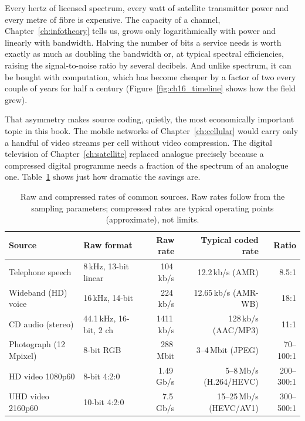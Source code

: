 Every hertz of licensed spectrum, every watt of satellite transmitter power and every metre of
fibre is expensive. The capacity of a channel, Chapter~\ref{ch:infotheory} tells us, grows only
logarithmically with power and linearly with bandwidth. Halving the number of bits a service
needs is worth exactly as much as doubling the bandwidth or, at typical spectral efficiencies,
raising the signal-to-noise ratio by several decibels. And unlike spectrum, it can be bought with
computation, which has become cheaper by a factor of two every couple of years for half a
century (Figure~\ref{fig:ch16_timeline} shows how the field grew).

That asymmetry makes source coding, quietly, the most economically important topic in this book.
The mobile networks of Chapter~\ref{ch:cellular} would carry only a handful of video streams per
cell without video compression. The digital television of Chapter~\ref{ch:satellite} replaced
analogue precisely because a compressed digital programme needs a fraction of the spectrum of an
analogue one. Table~\ref{tab:ch16:rates} shows just how dramatic the savings are.

\begin{table}[htbp]\centering\small
\caption{Raw and compressed rates of common sources. Raw rates follow from the sampling
parameters; compressed rates are typical operating points (approximate), not limits.}
\label{tab:ch16:rates}
\begin{tabularx}{\linewidth}{@{}l l r r r@{}}
\toprule
Source & Raw format & Raw rate & Typical coded rate & Ratio\\
\midrule
Telephone speech & 8\,kHz, 13-bit linear & 104\,kb/s & 12.2\,kb/s (AMR) & 8.5:1\\
Wideband (HD) voice & 16\,kHz, 14-bit & 224\,kb/s & 12.65\,kb/s (AMR-WB) & 18:1\\
CD audio (stereo) & 44.1\,kHz, 16-bit, 2 ch & 1411\,kb/s & 128\,kb/s (AAC/MP3) & 11:1\\
Photograph (12 Mpixel) & 8-bit RGB & 288\,Mbit & 3--4\,Mbit (JPEG) & 70--100:1\\
HD video 1080p60 & 8-bit 4:2:0 & 1.49\,Gb/s & 5--8\,Mb/s (H.264/HEVC) & 200--300:1\\
UHD video 2160p60 & 10-bit 4:2:0 & 7.5\,Gb/s & 15--25\,Mb/s (HEVC/AV1) & 300--500:1\\
\bottomrule
\end{tabularx}
\end{table}

